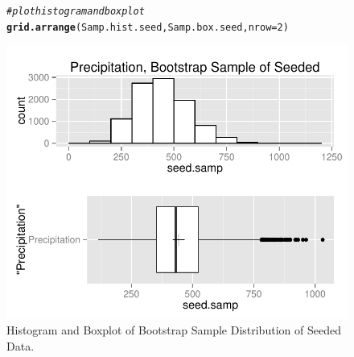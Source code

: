 \documentclass{article}\usepackage[]{graphicx}\usepackage[]{color}
\makeatletter
\def\maxwidth{ %
  \ifdim\Gin@nat@width>\linewidth
    \linewidth
  \else
    \Gin@nat@width
  \fi
}
\newcommand{\hlnum}[1]{\textcolor[rgb]{0.686,0.059,0.569}{#1}}%
\newcommand{\hlcom}[1]{\textcolor[rgb]{0.678,0.584,0.686}{\textit{#1}}}%
\newcommand{\hlstd}[1]{\textcolor[rgb]{0.345,0.345,0.345}{#1}}%
\newcommand{\hlkwc}[1]{\textcolor[rgb]{0.333,0.667,0.333}{#1}}%
\newcommand{\hlkwd}[1]{\textcolor[rgb]{0.737,0.353,0.396}{\textbf{#1}}}%
\newenvironment{kframe}{%
 \def\at@end@of@kframe{}%
 \ifinner\ifhmode%
  \def\at@end@of@kframe{\end{minipage}}%
  \begin{minipage}{\columnwidth}%
 \fi\fi%
 \def\FrameCommand##1{\hskip\@totalleftmargin \hskip-\fboxsep
 \colorbox{shadecolor}{##1}\hskip-\fboxsep
     \hskip-\linewidth \hskip-\@totalleftmargin \hskip\columnwidth}%
 \MakeFramed {\advance\hsize-\width
   \@totalleftmargin\z@ \linewidth\hsize
   \@setminipage}}%
 {\par\unskip\endMakeFramed%
 \at@end@of@kframe}
\newenvironment{knitrout}{}{} %
\makeatother
\begin{document}
\begin{figure}[H]  \begin{center} \vspace{-0.45in}
\begin{knitrout}
\color{fgcolor}\begin{kframe}
\begin{alltt}
\hlcom{# plot histogram and boxplot}
\hlkwd{grid.arrange}\hlstd{(Samp.hist.seed, Samp.box.seed,} \hlkwc{nrow} \hlstd{=} \hlnum{2}\hlstd{)}
\end{alltt}
\end{kframe}
\includegraphics[width=\maxwidth]{figure/1a_box_seed_plot} 

\end{knitrout}
\end{center}\caption{Histogram and Boxplot of Bootstrap Sample Distribution of Seeded Data.} \end{figure}
\end{document}
